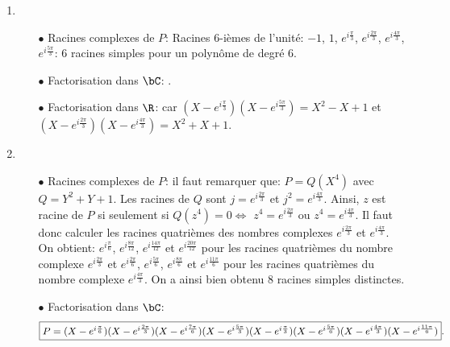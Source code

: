 \documentclass[a4paper, 11pt,reqno]{article}
\begin{document}
\begin{correction}
\begin{enumerate}
\begin{itemize}
			            Ainsi, le polyn\^ome est de degr\'e $n-1$ (ce qui est coh\'erent puisqu'on a trouv\'e $n-1$ racines complexes), et son coefficient dominant est $2ni$. On peut donc factoriser : .
		      \end{itemize}
		\item
		      \begin{itemize}
			      \item[$\bullet$] Racines complexes de $P$: Racines 6-i\`{e}mes de l'unit\'e: $-1$, $1$, $e^{i\frac{\pi}{3}}$, $e^{i\frac{2\pi}{3}}$, $e^{i\frac{4\pi}{3}}$, $e^{i\frac{5\pi}{3}}$: 6 racines simples pour un polyn\^{o}me de degr\'e 6.
			      \item[$\bullet$] Factorisation dans $\bC$: .
			      \item[$\bullet$] Factorisation dans $\R$:  car $(X-e^{i\frac{\pi}{3}})(X-e^{i\frac{5\pi}{3}})=X^2-X+1$ et $(X-e^{i\frac{2\pi}{3}})(X-e^{i\frac{4\pi}{3}})=X^2+X+1$.
		      \end{itemize}
		\item
		      \begin{itemize}
			      \item[$\bullet$] Racines complexes de $P$: il faut remarquer que: $P=Q(X^4)$ avec $Q=Y^2+Y+1$. Les racines de $Q$ sont $j=e^{i\frac{2\pi}{3}}$ et $j^2=e^{i\frac{4\pi}{3}}$. Ainsi, $z$ est racine de $P$ si seulement si $Q(z^4)=0\Leftrightarrow$ $z^4=e^{i\frac{2\pi}{3}}$ ou $z^4=e^{i\frac{4\pi}{3}}$. Il faut donc calculer les racines quatri\`{e}mes des nombres complexes
			            $e^{i\frac{2\pi}{3}}$ et $e^{i\frac{4\pi}{3}}$. On obtient: $e^{i\frac{\pi}{6}}$, $e^{i\frac{8\pi}{12}}$, $e^{i\frac{14\pi}{12}}$ et $e^{i\frac{20\pi}{12}}$ pour les racines quatri\`{e}mes du nombre complexe
			            $e^{i\frac{2\pi}{3}}$ et $e^{i\frac{2\pi}{6}}$, $e^{i\frac{5\pi}{6}}$, $e^{i\frac{8\pi}{6}}$ et $e^{i\frac{11\pi}{6}}$ pour les racines quatri\`{e}mes du nombre complexe $e^{i\frac{4\pi}{3}}$. On a ainsi bien obtenu 8 racines simples distinctes.
			      \item[$\bullet$] Factorisation dans $\bC$:
			            $$\fbox{$P=(X-e^{i\frac{\pi}{6}})(X-e^{i\frac{2\pi}{3}})(X-e^{i\frac{7\pi}{6}})(X-e^{i\frac{5\pi}{3}})(X-e^{i\frac{\pi}{3}})(X-e^{i\frac{5\pi}{6}})(X-e^{i\frac{4\pi}{3}})(X-e^{i\frac{11\pi}{6}})$}.$$

\end{itemize}
\end{enumerate}
\end{correction}
\end{document}
